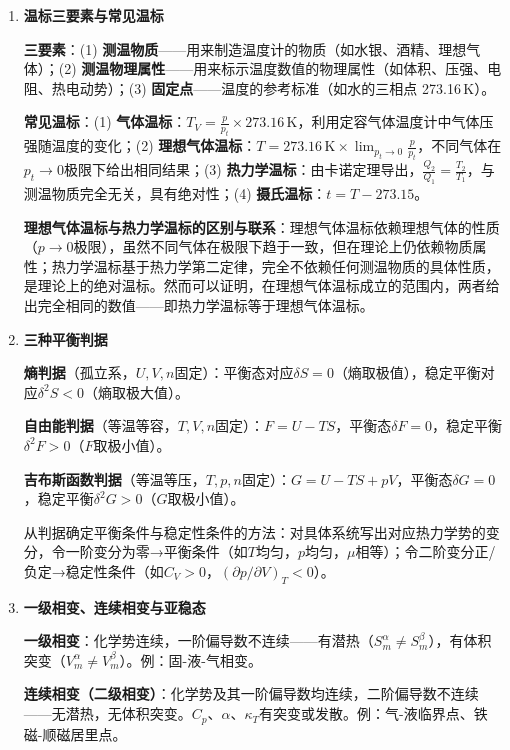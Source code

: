 \documentclass[12pt,a4paper,fontset=mac]{ctexart}
\newcommand{\đ}{\mathrm{đ}}
\begin{document}
\begin{enumerate}

\item \textbf{温标三要素与常见温标}

\textbf{三要素}：(1) \textbf{测温物质}——用来制造温度计的物质（如水银、酒精、理想气体）；(2) \textbf{测温物理属性}——用来标示温度数值的物理属性（如体积、压强、电阻、热电动势）；(3) \textbf{固定点}——温度的参考标准（如水的三相点 273.16\,K）。

\textbf{常见温标}：(1) \textbf{气体温标}：$T_V = \frac{p}{p_t}\times273.16\,\text{K}$，利用定容气体温度计中气体压强随温度的变化；(2) \textbf{理想气体温标}：$T = 273.16\,\text{K}\times\lim_{p_t\to0}\frac{p}{p_t}$，不同气体在$p_t\to0$极限下给出相同结果；(3) \textbf{热力学温标}：由卡诺定理导出，$\frac{Q_2}{Q_1}=\frac{T_2}{T_1}$，与测温物质完全无关，具有绝对性；(4) \textbf{摄氏温标}：$t = T - 273.15$。

\textbf{理想气体温标与热力学温标的区别与联系}：理想气体温标依赖理想气体的性质（$p\to0$极限），虽然不同气体在极限下趋于一致，但在理论上仍依赖物质属性；热力学温标基于热力学第二定律，完全不依赖任何测温物质的具体性质，是理论上的绝对温标。然而可以证明，在理想气体温标成立的范围内，两者给出完全相同的数值——即热力学温标等于理想气体温标。

\item \textbf{三种平衡判据}

\textbf{熵判据}（孤立系，$U,V,n$固定）：平衡态对应$\delta S=0$（熵取极值），稳定平衡对应$\delta^2S<0$（熵取极大值）。

\textbf{自由能判据}（等温等容，$T,V,n$固定）：$F=U-TS$，平衡态$\delta F=0$，稳定平衡$\delta^2F>0$（$F$取极小值）。

\textbf{吉布斯函数判据}（等温等压，$T,p,n$固定）：$G=U-TS+pV$，平衡态$\delta G=0$，稳定平衡$\delta^2G>0$（$G$取极小值）。

从判据确定平衡条件与稳定性条件的方法：对具体系统写出对应热力学势的变分，令一阶变分为零→平衡条件（如$T$均匀，$p$均匀，$\mu$相等）；令二阶变分正/负定→稳定性条件（如$C_V>0$，$(\partial p/\partial V)_T<0$）。

\item \textbf{一级相变、连续相变与亚稳态}

\textbf{一级相变}：化学势连续，一阶偏导数不连续——有潜热（$S_m^\alpha\neq S_m^\beta$），有体积突变（$V_m^\alpha\neq V_m^\beta$）。例：固-液-气相变。

\textbf{连续相变（二级相变）}：化学势及其一阶偏导数均连续，二阶偏导数不连续——无潜热，无体积突变。$C_p$、$\alpha$、$\kappa_T$有突变或发散。例：气-液临界点、铁磁-顺磁居里点。


\end{enumerate}
\end{document}
